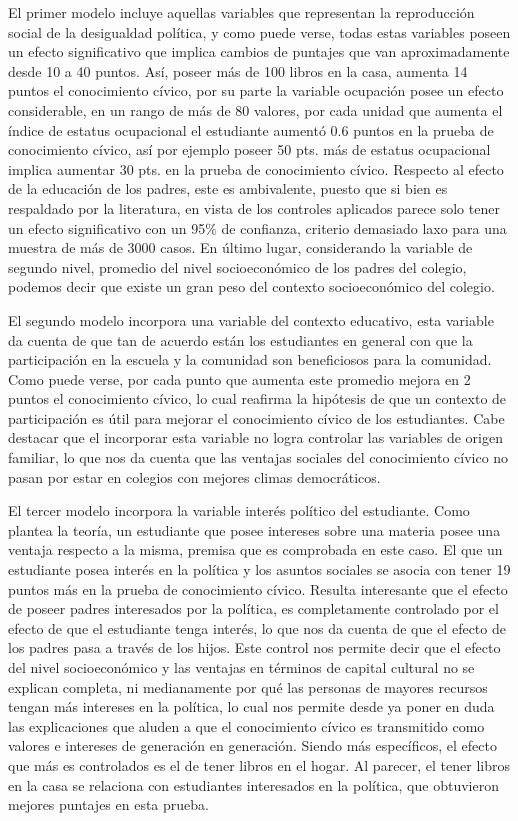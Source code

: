 \documentclass[12pt,twoside]{templates/facsothesis}
\begin{document}
El primer modelo incluye aquellas variables que representan la reproducción social de la desigualdad política, y como puede verse, todas estas variables poseen un efecto significativo que implica cambios de puntajes que van aproximadamente desde 10 a 40 puntos. Así, poseer más de 100 libros en la casa, aumenta 14 puntos el conocimiento cívico, por su parte la variable ocupación posee un efecto considerable, en un rango de más de 80 valores, por cada unidad que aumenta el índice de estatus ocupacional el estudiante aumentó 0.6 puntos en la prueba de conocimiento cívico, así por ejemplo poseer 50 pts. más de estatus ocupacional implica aumentar 30 pts. en la prueba de conocimiento cívico. Respecto al efecto de la educación de los padres, este es ambivalente, puesto que si bien es respaldado por la literatura, en vista de los controles aplicados parece solo tener un efecto significativo con un 95\% de confianza, criterio demasiado laxo para una muestra de más de 3000 casos. En último lugar, considerando la variable de segundo nivel, promedio del nivel socioeconómico de los padres del colegio, podemos decir que existe un gran peso del contexto socioeconómico del colegio.

El segundo modelo incorpora una variable del contexto educativo, esta variable da cuenta de que tan de acuerdo están los estudiantes en general con que la participación en la escuela y la comunidad son beneficiosos para la comunidad. Como puede verse, por cada punto que aumenta este promedio mejora en 2 puntos el conocimiento cívico, lo cual reafirma la hipótesis de que un contexto de participación es útil para mejorar el conocimiento cívico de los estudiantes. Cabe destacar que el incorporar esta variable no logra controlar las variables de origen familiar, lo que nos da cuenta que las ventajas sociales del conocimiento cívico no pasan por estar en colegios con mejores climas democráticos.

El tercer modelo incorpora la variable interés político del estudiante. Como plantea la teoría, un estudiante que posee intereses sobre una materia posee una ventaja respecto a la misma, premisa que es comprobada en este caso. El que un estudiante posea interés en la política y los asuntos sociales se asocia con tener 19 puntos más en la prueba de conocimiento cívico. Resulta interesante que el efecto de poseer padres interesados por la política, es completamente controlado por el efecto de que el estudiante tenga interés, lo que nos da cuenta de que el efecto de los padres pasa a través de los hijos. Este control nos permite decir que el efecto del nivel socioeconómico y las ventajas en términos de capital cultural no se explican completa, ni medianamente por qué las personas de mayores recursos tengan más intereses en la política, lo cual nos permite desde ya poner en duda las explicaciones que aluden a que el conocimiento cívico es transmitido como valores e intereses de generación en generación. Siendo más específicos, el efecto que más es controlados es el de tener libros en el hogar. Al parecer, el tener libros en la casa se relaciona con estudiantes interesados en la política, que obtuvieron mejores puntajes en esta prueba.
\end{document}
